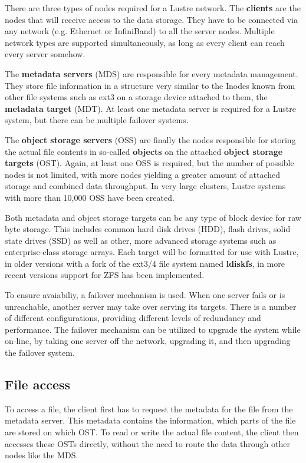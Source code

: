 There are three types of nodes required for a Lustre network. The
\textbf{clients} are the nodes that will receive access to the data storage.
They have to be connected via any network (e.g. Ethernet or InfiniBand) to all
the server nodes. Multiple network types are supported simultaneously, as long
as every client can reach every server somehow.

The \textbf{metadata servers} (MDS) are responsible for every metadata management.
They store file information in a structure very similar to the Inodes known from
other file systems such as ext3 on a storage device attached to them, the
\textbf{metadata target} (MDT). At least one metadata server is required for
a Lustre system, but there can be multiple failover systems.

The \textbf{object storage servers} (OSS) are finally the nodes responsible for
storing the actual file contents in so-called \textbf{objects} on the attached
\textbf{object storage targets} (OST). Again, at least one OSS is required, but
the number of possible nodes is not limited, with more nodes yielding a greater
amount of attached storage and combined data throughput. In very large clusters,
Lustre systems with more than 10,000 OSS have been created.

Both metadata and object storage targets can be any type of block device for raw
byte storage. This includes common hard disk drives (HDD), flash drives, solid
state drives (SSD) as well as other, more advanced storage systems such as
enterprise-class storage arrays. Each target will be formatted for use with
Lustre, in older versions with a fork of the ext3/4 file system named
\textbf{ldiskfs}, in more recent versions support for ZFS has been implemented.

To ensure avaiabiliy, a failover mechanism is used. When one server fails or is
unreachable, another server may take over serving its targets. There is a
number of different configurations, providing different levels of redundancy and
performance. The failover mechanism can be utilized to upgrade the system while
on-line, by taking one server off the network, upgrading it, and then upgrading
the failover system.

\subsection{File access}

To access a file, the client first has to request the metadata for the file
from the metadata server. This metadata contains the information, which parts
of the file are stored on which OST. To read or write the actual file content,
the client then accesses these OSTs directly, without the need to route the data
through other nodes like the MDS.

